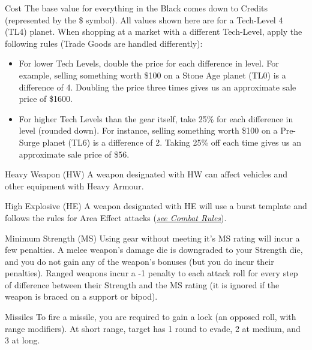\begin{multicols}{2}
\begin{genericsection}{Cost}
The base value for everything in the Black comes down to Credits (represented by the \$ symbol). All values shown here are for a Tech-Level 4 (TL4) planet. When shopping at a market with a different Tech-Level, apply the following rules (Trade Goods are handled differently):
\begin{itemize}
  \item For lower Tech Levels, double the price for each difference in level. For example, selling something worth \$100 on a Stone Age planet (TL0) is a difference of 4. Doubling the price three times gives us an approximate sale price of \$1600.

  \item For higher Tech Levels than the gear itself, take 25\% for each difference in level (rounded down). For instance, selling something worth \$100 on a Pre-Surge planet (TL6) is a difference of 2. Taking 25\% off each time gives us an approximate sale price of \$56.
\end{itemize}
\end{genericsection}

\begin{genericsection}{Heavy Weapon (HW)}
A weapon designated with HW can affect vehicles and other equipment with Heavy Armour.
\end{genericsection}

\begin{genericsection}{High Explosive (HE)}
A weapon designated with HE will use a burst template and follows the rules for Area Effect attacks (\textit{\hyperref[sec:rules-combat]{see Combat Rules}}).
\end{genericsection}

\begin{genericsection}{Minimum Strength (MS)}
Using gear without meeting it's MS rating will incur a few penalties. A melee weapon's damage die is downgraded to your Strength die, and you do not gain any of the weapon's bonuses (but you do incur their penalties). Ranged weapons incur a -1 penalty to each attack roll for every step of difference between their Strength and the MS rating (it is ignored if the weapon is braced on a support or bipod).
\end{genericsection}

\begin{genericsection}{Missiles}
To fire a missile, you are required to gain a lock (an opposed roll, with range modifiers). At short range, target has 1 round to evade, 2 at medium, and 3 at long.
\end{genericsection}


\end{multicols}
